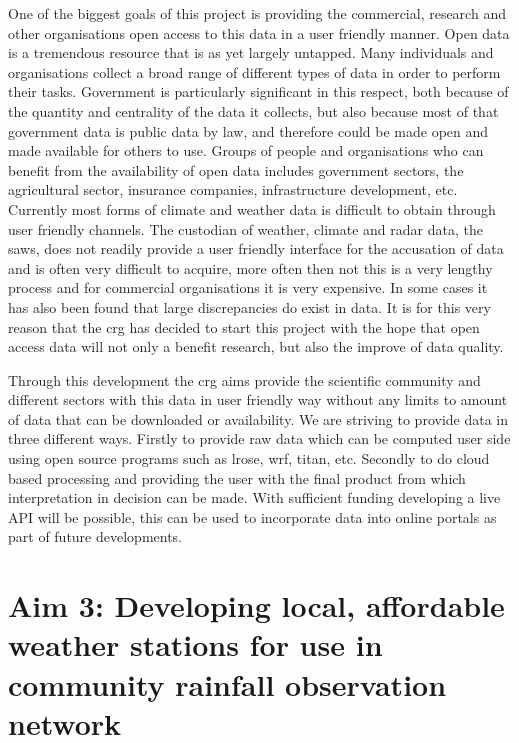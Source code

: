 \documentclass{wrcreport}
\begin{document}
One of the biggest goals of this project is providing the commercial,
research and other organisations open access to this data in a user
friendly manner. Open data is a tremendous resource that is as yet
largely untapped. Many individuals and organisations collect a broad
range of different types of data in order to perform their tasks.
Government is particularly significant in this respect, both because
of the quantity and centrality of the data it collects, but also
because most of that government data is public data by law, and
therefore could be made open and made available for others to use.
Groups of people and organisations who can benefit from the
availability of open data includes government sectors, the
agricultural sector, insurance companies, infrastructure development,
etc. Currently most forms of climate and weather data is difficult to
obtain through user friendly channels. The custodian of weather,
climate and radar data, the \gls{saws}, does not readily provide a
user friendly interface for the accusation of data and is often very
difficult to acquire, more often then not this is a very lengthy
process and for commercial organisations it is very expensive. In some
cases it has also been found that large discrepancies do exist in
data. It is for this very reason that the \gls{crg} has decided to
start this project with the hope that open access data will not only a
benefit research, but also the improve of data quality.

Through this development the \gls{crg} aims provide the scientific
community and different sectors with this data in user friendly way
without any limits to amount of data that can be downloaded or
availability. We are striving to provide data in three different ways.
Firstly to provide raw data which can be computed user side using open
source programs such as \gls{lrose}, \gls{wrf}, titan, etc. Secondly
to do cloud based processing and providing the user with the final
product from which interpretation in decision can be made. With
sufficient funding developing a live API will be possible, this can be
used to incorporate  data into online portals as part of future
developments.

\section{Aim 3: Developing local, affordable weather stations for use
in community rainfall observation network}
\end{document}
